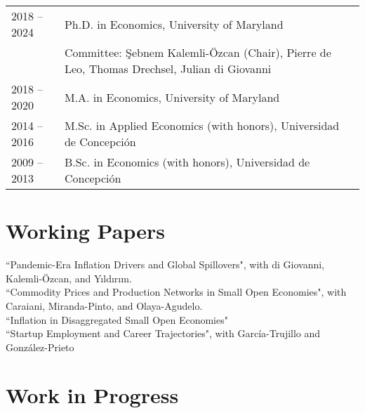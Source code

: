 \documentclass[10pt]{article}
\begin{document}
\begin{tabular}{@{}p{1.8cm}p{13cm}}
    2018 -- 2024 & Ph.D. in Economics, University of Maryland\\
    & \small Committee: \c{S}ebnem Kalemli-\"{O}zcan (Chair), Pierre de Leo, Thomas Drechsel, Julian di Giovanni\\
    2018 -- 2020 & M.A. in Economics, University of Maryland\\
    2014 -- 2016 & M.Sc. in Applied Economics (with honors), Universidad de Concepci\'on\\
    2009 -- 2013 & B.Sc. in Economics (with honors), Universidad de Concepci\'on
\end{tabular}


\section*{Working Papers}

\noindent ``Pandemic-Era Inflation Drivers and Global Spillovers", with di Giovanni, Kalemli-\"{O}zcan, and Y{\i}ld{\i}r{\i}m. \\[-0.125in]

\noindent ``Commodity Prices and Production Networks in Small Open Economies", with Caraiani, Miranda-Pinto, and Olaya-Agudelo.\\[-0.125in]


\noindent ``Inflation in Disaggregated Small Open Economies"\\[-0.125in]

\noindent ``Startup Employment and Career Trajectories", with Garc\'ia-Trujillo and Gonz\'alez-Prieto





\section*{Work in Progress}
\end{document}
